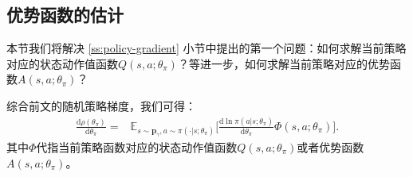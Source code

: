\subsection{优势函数的估计}

本节我们将解决 \ref{ss:policy-gradient} 小节中提出的第一个问题：如何求解当前策略对应的状态动作值函数$Q(s, a; \theta_\pi)$？等进一步，如何求解当前策略对应的优势函数$A(s, a; \theta_\pi)$？

综合前文的随机策略梯度，我们可得：
\begin{equation}
    \begin{aligned}
    \frac{\mathrm{d} \rho(\theta_\pi)}{\mathrm{d} \theta_\pi}
    =& \mathbb{E}_{s \sim \mathbf{p}_\gamma, a \sim \pi(\cdot \vert s; \theta_\pi)}
    \bigg[\frac{\mathrm{d} \ln \pi(a \vert s; \theta_\pi)}
    {\mathrm{d} \theta_\pi} \Phi(s, a; \theta_\pi)\bigg].
    \end{aligned}
\end{equation}
其中$\Phi$代指当前策略函数对应的状态动作值函数$Q(s, a; \theta_\pi)$或者优势函数$A(s, a; \theta_\pi)$。

